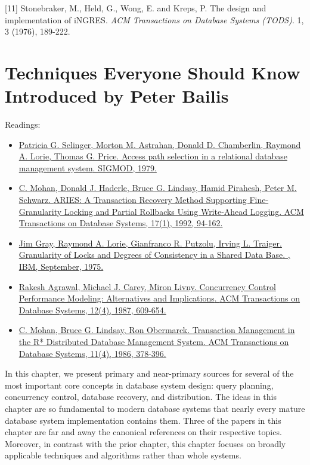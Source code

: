\documentclass[b5paper,11pt,twoside,openright]{book}
\newcommand\Chapter[3]{
  \hypertarget{#1}{
    \chapter[#2]{#2\\{\Large #3}}
  }
}
\begin{document}
\leavevmode\hypertarget{ref-ingres}{}%
{[}11{]} Stonebraker, M., Held, G., Wong, E. and Kreps, P. The design
and implementation of iNGRES. \emph{ACM Transactions on Database Systems
  (TODS)}. 1, 3 (1976), 189-222.


\Chapter{ch3-techniques}{%
Techniques Everyone Should Know}{%
Introduced by Peter Bailis
}

\begin{framed}
Readings:

\begin{itemize}
\item
\href{https://scholar.google.com/scholar?cluster=102545501597608314}{Patricia
  G. Selinger, Morton M. Astrahan, Donald D. Chamberlin, Raymond A. Lorie,
  Thomas G. Price. {Access path selection in a relational database
    management system}. {SIGMOD}, 1979.}
\item
\href{https://scholar.google.com/scholar?cluster=2142924814045750364}{C.
  Mohan, Donald J. Haderle, Bruce G. Lindsay, Hamid Pirahesh, Peter M.
  Schwarz. {ARIES: A Transaction Recovery Method Supporting
    Fine-Granularity Locking and Partial Rollbacks Using Write-Ahead
    Logging}. {ACM Transactions on Database Systems}, 17(1), 1992, 94-162.}
\item
\href{https://scholar.google.com/scholar?cluster=15730220590995320737}{Jim
  Gray, Raymond A. Lorie, Gianfranco R. Putzolu, Irving L. Traiger.
  {Granularity of Locks and Degrees of Consistency in a Shared Data Base}.
  {}, IBM, September, 1975.}
\item
\href{https://scholar.google.com/scholar?cluster=9784855600346107276}{Rakesh
  Agrawal, Michael J. Carey, Miron Livny. {Concurrency Control Performance
    Modeling: Alternatives and Implications}. {ACM Transactions on Database
    Systems}, 12(4), 1987, 609-654.}
\item
\href{https://scholar.google.com/scholar?cluster=6135007404184895390}{C.
  Mohan, Bruce G. Lindsay, Ron Obermarck. {Transaction Management in the
    R* Distributed Database Management System}. {ACM Transactions on
    Database Systems}, 11(4), 1986, 378-396.}
\end{itemize}
\end{framed}

In this chapter, we present primary and near-primary sources for several
of the most important core concepts in database system design: query
planning, concurrency control, database recovery, and distribution. The
ideas in this chapter are so fundamental to modern database systems that
nearly every mature database system implementation contains them. Three
of the papers in this chapter are far and away the canonical references
on their respective topics. Moreover, in contrast with the prior
chapter, this chapter focuses on broadly applicable techniques and
algorithms rather than whole systems.
\end{document}
